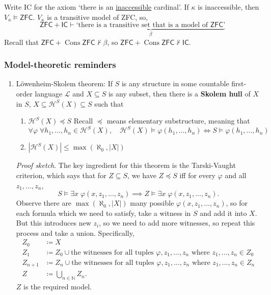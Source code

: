 \documentclass{article}
\DeclareMathOperator{\cons}{Cons}
\let\models\vDash
\begin{document}
\newlec Write \textsf{IC} for the axiom `there is an \hyperlink{def:inacc}{inaccessible} cardinal'.
If $\kappa$ is inaccessible, then $V_\kappa \models \textsf{ZFC}$.
$V_\kappa$ is a transitive model of \textsf{ZFC}, so,
\begin{equation*}
  \textsf{ZFC} + \textsf{IC} \vdash \underbrace{\text{`there is a transitive set that is a model of }\textsf{ZFC}\text{'}}_{\beta}
\end{equation*}
Recall that $\textsf{ZFC} + \cons{\textsf{ZFC}} \nvdash \beta$, so $\textsf{ZFC} + \cons{\textsf{ZFC}} \nvdash \textsf{IC}$.

\subsubsection{Model-theoretic reminders}
\begin{enumerate}
  \item L\"owenheim-Skolem theorem:
    If $S$ is any structure in some countable first-order language $\mathcal{L}$ and $X \subseteq S$ is any subset, then there is a \textbf{Skolem hull} of $X$ in $S$,
    $X \subseteq \mathcal{H}^S(X) \subseteq S$ such that
    \begin{enumerate}
      \item $\mathcal{H}^S(X) \preccurlyeq S$ Recall $\preccurlyeq$ means elementary substructure, meaning that
        \begin{equation*}\forall \varphi \; \forall h_1, \dotsc, h_n \in \mathcal{H}^S(X), \quad \mathcal{H}^S(X) \models \varphi(h_1, \dotsc, h_n) \iff S \models \varphi(h_1, \dotsc, h_n)\end{equation*}
        \item
          $|\mathcal{H}^S(X)| \leq \max(\aleph_0, |X|)$
    \end{enumerate}

    \emph{Proof sketch}. The key ingredient for this theorem is the Tarski-Vaught criterion, which says that for $Z \subseteq S$, we have $Z \preccurlyeq S$ iff for every $\varphi$ and all $z_1, \dotsc, z_n$,
    \begin{equation*}
      S \models \exists x\; \varphi(x, z_1, \dotsc, z_n) \implies Z \models \exists x\; \varphi(x, z_1, \dotsc, z_n).
    \end{equation*}
    Observe there are $\max(\aleph_0, |X|)$ many possible $\varphi(x, z_1, \dotsc, z_n)$, so for each formula which we need to satisfy, take a witness in $S$ and add it into $X$.
    But this introduces new $z_i$, so we need to add more witnesses, so repeat this process and take a union. Specifically,
    \begin{align*}
      Z_0 &\coloneqq X \\
      Z_1 &\coloneqq Z_0 \cup \text{the witnesses for all tuples $\varphi, z_1, \dotsc, z_n$ where $z_1, \dotsc, z_n \in Z_0$} \\
      Z_{n+1} &\coloneqq Z_n \cup \text{the witnesses for all tuples $\varphi, z_1, \dotsc, z_n$ where $z_1, \dotsc, z_n \in Z_n$} \\
      Z &\coloneqq \bigcup_{n \in \mathbb{N}} Z_n.
    \end{align*}
    $Z$ is the required model. \qedhere


\end{enumerate}
\end{document}
